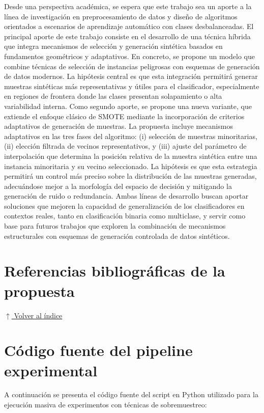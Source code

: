 \documentclass[12pt,a4paper]{article}
\begin{document}
Desde una perspectiva académica, se espera que este trabajo sea un aporte a la línea de investigación en preprocesamiento de datos y diseño de algoritmos orientados a escenarios de aprendizaje automático con clases desbalanceadas. 
El principal aporte de este trabajo consiste en el desarrollo de una técnica híbrida que integra mecanismos de selección y generación sintética basados en fundamentos geométricos y adaptativos. En concreto, se propone un modelo que combine técnicas de selección de instancias peligrosas con esquemas de generación de datos modernos. La hipótesis central es que esta integración permitirá generar muestras sintéticas más representativas y útiles para el clasificador, especialmente en regiones de frontera donde las clases presentan solapamiento o alta variabilidad interna.
Como segundo aporte, se propone una nueva variante, que extiende el enfoque clásico de SMOTE mediante la incorporación de criterios adaptativos de generación de muestras. La propuesta incluye mecanismos adaptativos en las tres fases del algoritmo: (i) selección de muestras minoritarias, (ii) elección filtrada de vecinos representativos, y (iii) ajuste del parámetro de interpolación que determina la posición relativa de la muestra sintética entre una instancia minoritaria y su vecino seleccionado. La hipótesis es que esta estrategia permitirá un control más preciso sobre la distribución de las muestras generadas, adecuándose mejor a la morfología del espacio de decisión y mitigando la generación de ruido o redundancia.
Ambas líneas de desarrollo buscan aportar soluciones que mejoren la capacidad de generalización de los clasificadores en contextos reales, tanto en clasificación binaria como multiclase, y servir como base para futuros trabajos que exploren la combinación de mecanismos estructurales con esquemas de generación controlada de datos sintéticos.

\section{Referencias bibliográficas de la propuesta} \noindent\hyperlink{toc}{\small$\uparrow$ Volver al índice}
\printbibliography

\appendix

\section{Código fuente del pipeline experimental}
\label{apendice:codigo_pipeline}

A continuación se presenta el código fuente del script en Python utilizado para la ejecución masiva de experimentos con técnicas de sobremuestreo:


\end{document}
